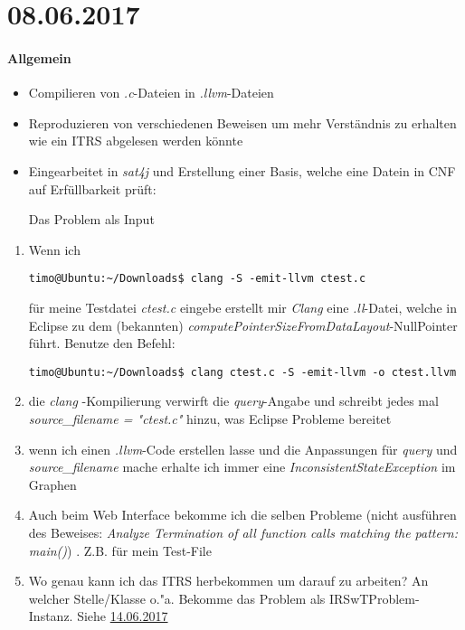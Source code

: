 \section*{08.06.2017}

\paragraph{Allgemein}
\begin{itemize}
	\item Compilieren von \emph{.c}-Dateien in \emph{.llvm}-Dateien
	\item Reproduzieren von verschiedenen Beweisen um mehr Verständnis zu erhalten wie ein ITRS abgelesen werden könnte
	\item Eingearbeitet in \emph{sat4j} und Erstellung einer Basis, welche eine Datein in CNF auf Erfüllbarkeit prüft: 
	
	Das Problem als Input
	
	
	
\end{itemize}

\begin{enumerate}
	\item Wenn ich 
		\lstset{autogobble=true}
		\begin{lstlisting}[style=BASH]
			timo@Ubuntu:~/Downloads$ clang -S -emit-llvm ctest.c
		\end{lstlisting}
		für meine Testdatei \emph{ctest.c} eingebe erstellt mir \emph{Clang} eine \emph{.ll}-Datei, welche in Eclipse zu dem (bekannten) \emph{computePointerSizeFromDataLayout}-NullPointer führt. \newline
		\answer Benutze den Befehl: 
		\begin{lstlisting}[style=BASH]
			timo@Ubuntu:~/Downloads$ clang ctest.c -S -emit-llvm -o ctest.llvm
		\end{lstlisting}
	\item die \emph{clang} -Kompilierung verwirft die \emph{query}-Angabe und schreibt jedes mal \emph{source\_filename = "ctest.c"} hinzu, was Eclipse Probleme bereitet
	\item wenn ich einen \emph{.llvm}-Code erstellen lasse und die Anpassungen für \emph{query} und \emph{source\_filename} mache erhalte ich immer eine \emph{InconsistentStateException} im Graphen 
	\item Auch beim Web Interface bekomme ich die selben Probleme (nicht ausführen des Beweises: \emph{Analyze Termination of all function calls matching the pattern: main()}) . Z.B. für mein Test-File
		\lstset{escapechar=@, style=customc,xleftmargin=.2\textwidth, xrightmargin=.2\textwidth, autogobble=true}
			
	\item Wo genau kann ich das ITRS herbekommen um darauf zu arbeiten? An welcher Stelle/Klasse o."a. \answer Bekomme das Problem als IRSwTProblem-Instanz. Siehe \hyperref[IRSwTProblemMethoden]{14.06.2017}
\end{enumerate}

